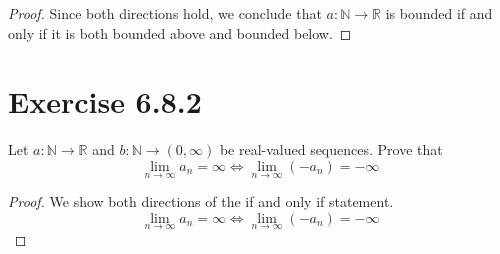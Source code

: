 \documentclass{article}
\newcommand{\N}{\mathbb{N}}
\newcommand{\R}{\mathbb{R}}
\theoremstyle{mytheoremstyle}
\theoremstyle{mytheoremstyle}
\theoremstyle{myproblemstyle}
\begin{document}
\begin{proof}
        Since both directions hold, we conclude that $a: \N \to \R$ is bounded if and only if it is both bounded above and bounded below.
    \end{proof}

    \section{Exercise 6.8.2}
    \begin{problem}
        Let $a: \N \to \R$ and $b: \N \to (0,\infty)$ be real-valued sequences. Prove that
        $$\lim_{n\to\infty}a_n = \infty \iff \lim_{n\to\infty}(-a_n) = -\infty$$
    \end{problem}
    \begin{proof}
        We show both directions of the if and only if statement.
        $$\lim_{n\to\infty}a_n = \infty \iff \lim_{n\to\infty}(-a_n) = -\infty$$


\end{proof}
\end{document}
